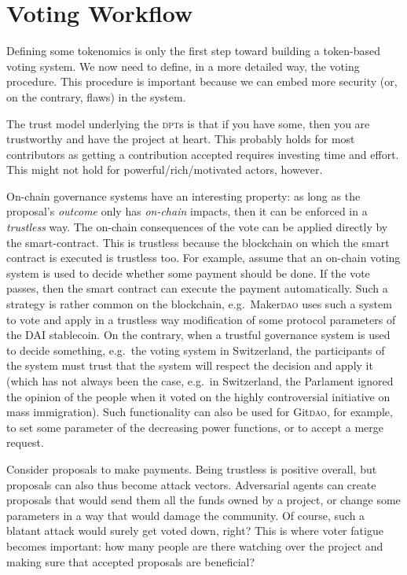 \chapter{Voting Workflow}
\label{sec:governance_system_voting_workflow}

Defining some tokenomics is only the first step toward building a token-based voting system.
We now need to define, in a more detailed way, the voting procedure.
This procedure is important because we can embed more security (or, on the contrary, flaws) in the system.

The trust model underlying the \textsc{dpt}s is that if you have some, then you are trustworthy and have the project at heart.
This probably holds for most contributors as getting a contribution accepted requires investing time and effort.
This might not hold for powerful/rich/motivated actors, however.

On-chain governance systems have an interesting property: as long as the proposal's \emph{outcome} only has \emph{on-chain} impacts, then it can be enforced in a \emph{trustless} way.
The on-chain consequences of the vote can be applied directly by the smart-contract.
This is trustless because the blockchain on which the smart contract is executed is trustless too.
For example, assume that an on-chain voting system is used to decide whether some payment should be done.
If the vote passes, then the smart contract can execute the payment automatically.
Such a strategy is rather common on the blockchain, e.g.\ Maker\textsc{dao} uses such a system to vote and apply in a trustless way modification of some protocol parameters of the DAI stablecoin.
On the contrary, when a trustful governance system is used to decide something, e.g.\ the voting system in Switzerland, the participants of the system must trust that the system will respect the decision and apply it (which has not always been the case, e.g.\ in Switzerland, the Parlament ignored the opinion of the people when it voted on the highly controversial initiative on mass immigration).
Such functionality can also be used for Git\textsc{dao}, for example, to set some parameter of the decreasing power functions, or to accept a merge request.

Consider proposals to make payments.
Being trustless is positive overall, but proposals can also thus become attack vectors.
Adversarial agents can create proposals that would send them all the funds owned by a project, or change some parameters in a way that would damage the community.
Of course, such a blatant attack would surely get voted down, right?
This is where voter fatigue becomes important: how many people are there watching over the project and making sure that accepted proposals are beneficial?

